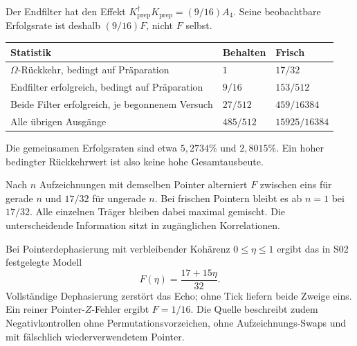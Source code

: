 Der Endfilter hat den Effekt $K_{\mathrm{prep}}^\dagger K_{\mathrm{prep}}=(9/16)A_4$. Seine beobachtbare Erfolgsrate ist deshalb $(9/16)F$, nicht $F$ selbst.
\par\noindent\begin{tabularx}{\linewidth}{L{68mm}Y Y}
\toprule
\textbf{Statistik}&\textbf{Behalten}&\textbf{Frisch}\\\midrule
$\Omega$-Rückkehr, bedingt auf Präparation&$1$&$17/32$\\
Endfilter erfolgreich, bedingt auf Präparation&$9/16$&$153/512$\\
Beide Filter erfolgreich, je begonnenem Versuch&$27/512$&$459/16384$\\
Alle übrigen Ausgänge&$485/512$&$15925/16384$\\\bottomrule
\end{tabularx}\par
Die gemeinsamen Erfolgsraten sind etwa $5{,}2734\%$ und $2{,}8015\%$. Ein hoher bedingter Rückkehrwert ist also keine hohe Gesamtausbeute.

Nach $n$ Aufzeichnungen mit demselben Pointer alterniert $F$ zwischen eins für gerade $n$ und $17/32$ für ungerade $n$. Bei frischen Pointern bleibt es ab $n=1$ bei $17/32$. Alle einzelnen Träger bleiben dabei maximal gemischt. Die unterscheidende Information sitzt in zugänglichen Korrelationen.

Bei Pointerdephasierung mit verbleibender Kohärenz $0\le\eta\le1$ ergibt das in S02 festgelegte Modell
\begin{equation}
F(\eta)=\frac{17+15\eta}{32}.
\end{equation}
Vollständige Dephasierung zerstört das Echo; ohne Tick liefern beide Zweige eins. Ein reiner Pointer-$Z$-Fehler ergibt $F=1/16$. Die Quelle beschreibt zudem Negativkontrollen ohne Permutationsvorzeichen, ohne Aufzeichnungs-Swaps und mit fälschlich wiederverwendetem Pointer.

